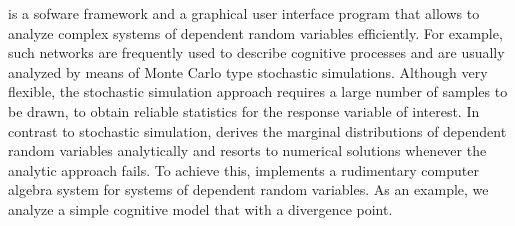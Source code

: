  is a sofware framework and a graphical user interface program that allows to analyze
complex systems of dependent random variables efficiently. For example, such networks are 
frequently used to describe cognitive processes and are usually analyzed by means of Monte Carlo
type stochastic simulations. Although very flexible, the stochastic simulation approach requires a
large number of samples to be drawn, to obtain reliable statistics for the response variable of
interest. In contrast to stochastic simulation,  derives the marginal distributions of
dependent random variables analytically and resorts to numerical solutions whenever the analytic
approach fails. To achieve this,   implements a rudimentary computer algebra system
for systems of dependent random variables. As an example, we analyze a simple cognitive model that
with a divergence point.